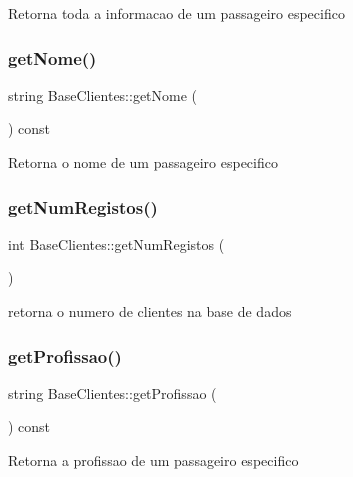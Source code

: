Retorna toda a informacao de um passageiro especifico \mbox{\label{class_base_clientes_a15d398aef3b426df9f0a76602ebfc1bc}} 
\subsubsection{\texorpdfstring{get\+Nome()}{getNome()}}
{\footnotesize\ttfamily string Base\+Clientes\+::get\+Nome (\begin{DoxyParamCaption}{ }\end{DoxyParamCaption}) const}

Retorna o nome de um passageiro especifico \mbox{\label{class_base_clientes_a890a2929f2f11f7ba7a1d412e1754747}} 
\subsubsection{\texorpdfstring{get\+Num\+Registos()}{getNumRegistos()}}
{\footnotesize\ttfamily int Base\+Clientes\+::get\+Num\+Registos (\begin{DoxyParamCaption}{ }\end{DoxyParamCaption})}

retorna o numero de clientes na base de dados \mbox{\label{class_base_clientes_a48f26cf2050fb9081cb3e3af649b2a69}} 
\subsubsection{\texorpdfstring{get\+Profissao()}{getProfissao()}}
{\footnotesize\ttfamily string Base\+Clientes\+::get\+Profissao (\begin{DoxyParamCaption}{ }\end{DoxyParamCaption}) const}

Retorna a profissao de um passageiro especifico \mbox{\label{class_base_clientes_addf94bea5b7b66371ff58f34c0655fd7}} 
